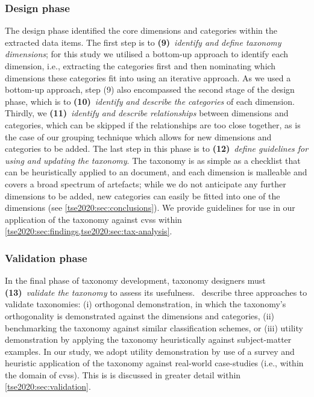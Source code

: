 \subsubsection{Design phase} The design phase identified the core dimensions and categories within the extracted data items. The first step is to \textbf{(9)}~\textit{identify and define taxonomy dimensions}; for this study we utilised a bottom-up approach to identify each dimension, i.e., extracting the categories first and then nominating which dimensions these categories fit into using an iterative approach. As we used a bottom-up approach, step (9) also encompassed the second stage of the design phase, which is to \textbf{(10)}~\textit{identify and describe the categories} of each dimension. Thirdly, we \textbf{(11)}~\textit{identify and describe relationships} between dimensions and categories, which can be skipped if the relationships are too close together, as is the case of our grouping technique which allows for new dimensions and categories to be added. The last step in this phase is to \textbf{(12)}~\textit{define guidelines for using and updating the taxonomy}. The taxonomy is as simple as a checklist that can be heuristically applied to an  document, and each dimension is malleable and covers a broad spectrum of artefacts; while we do not anticipate any further dimensions to be added, new categories can easily be fitted into one of the dimensions (see \cref{tse2020:sec:conclusions}). We provide guidelines for use in our application of the taxonomy against \glspl{cvs} within \cref{tse2020:sec:findings,tse2020:sec:tax-analysis}.

\subsubsection{Validation phase} In the final phase of taxonomy development, taxonomy designers must \textbf{(13)}~\textit{validate the taxonomy} to assess its usefulness.~\citet{Usman:2017hn} describe three approaches to validate taxonomies: (i) orthogonal demonstration, in which the taxonomy's orthogonality is demonstrated against the dimensions and categories, (ii) benchmarking the taxonomy against similar classification schemes, or (iii) utility demonstration by applying the taxonomy heuristically against subject-matter examples. In our study, we adopt utility demonstration by use of a survey and heuristic application of the taxonomy against real-world case-studies (i.e., within the domain of \glspl{cvs}). This is is discussed in greater detail within \cref{tse2020:sec:validation}.


